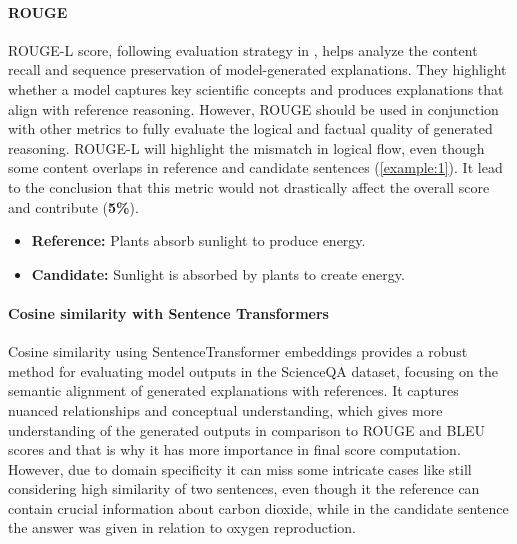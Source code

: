 \documentclass{article}
\begin{document}
\paragraph{ROUGE}
ROUGE-L score, following evaluation strategy in \cite{lu2022learn}, helps analyze the content recall and sequence preservation of model-generated explanations. They highlight whether a model captures key scientific concepts and produces explanations that align with reference reasoning. However, ROUGE should be used in conjunction with other metrics to fully evaluate the logical and factual quality of generated reasoning. ROUGE-L will highlight the mismatch in logical flow, even though some content overlaps in reference and candidate sentences (\ref{example:1}). It lead to the conclusion that this metric would not drastically affect the overall score and contribute (\textbf{5\%}).

\label{example:1}
\begin{itemize}
    \item \textbf{Reference:} Plants absorb sunlight to produce energy.
    \item \textbf{Candidate:} Sunlight is absorbed by plants to create energy.
\end{itemize}

\paragraph{Cosine similarity with Sentence Transformers}
Cosine similarity using SentenceTransformer embeddings provides a robust method for evaluating model outputs in the ScienceQA dataset, focusing on the semantic alignment of generated explanations with references. It captures nuanced relationships and conceptual understanding, which gives more understanding of the generated outputs in comparison to ROUGE and BLEU scores and that is why it has more importance in final score computation. However, due to domain specificity it can miss some intricate cases like still considering high similarity of two sentences, even though it the reference can contain crucial information about carbon dioxide, while in the candidate sentence the answer was given in relation to oxygen reproduction.
\end{document}

